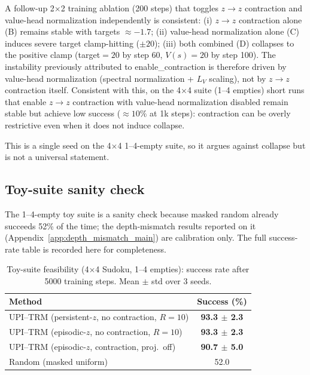 \documentclass{article}
\theoremstyle{plain}
\theoremstyle{definition}
\theoremstyle{remark}
\begin{document}
A follow-up 2$\times$2 training ablation (200 steps) that toggles $z\!\to\!z$ contraction and value-head normalization independently is consistent: (i) $z\!\to\!z$ contraction alone (B) remains stable with targets $\approx -1.7$; (ii) value-head normalization alone (C) induces severe target clamp-hitting ($\pm 20$); (iii) both combined (D) collapses to the positive clamp (target${}=20$ by step 60, $V(s)=20$ by step 100).
The instability previously attributed to enable\_contraction is therefore driven by value-head normalization (spectral normalization + $L_V$ scaling), not by $z\!\to\!z$ contraction itself.
Consistent with this, on the 4$\times$4 suite (1--4 empties) short runs that enable $z\!\to\!z$ contraction with value-head normalization disabled remain stable but achieve low success (${\approx}10\%$ at 1k steps): contraction can be overly restrictive even when it does not induce collapse.

This is a single seed on the 4$\times$4 1--4-empty suite, so it argues against collapse but is not a universal statement.




\subsection{Toy-suite sanity check}
\label{app:toy_feasibility}

The 1--4-empty toy suite is a sanity check because masked random already succeeds 52\% of the time; the depth-mismatch results reported on it (Appendix~\ref{app:depth_mismatch_main}) are calibration only. The full success-rate table is recorded here for completeness.

\begin{table}[t]
\caption{Toy-suite feasibility (4$\times$4 Sudoku, 1--4 empties): success rate after 5000 training steps. Mean $\pm$ std over 3 seeds.}
\label{tab:upi_success_only}
\centering
\small
\begin{tabular*}{\columnwidth}{@{\extracolsep{\fill}}lc@{}}
\toprule
Method & Success (\%) \\
\midrule
UPI--TRM (persistent-$z$, no contraction, $R{=}10$) & \textbf{93.3 $\pm$ 2.3} \\
UPI--TRM (episodic-$z$, no contraction, $R{=}10$) & \textbf{93.3 $\pm$ 2.3} \\
UPI--TRM (episodic-$z$, contraction, proj.\ off) & \textbf{90.7 $\pm$ 5.0} \\
Random (masked uniform) & 52.0 \\
\bottomrule
\end{tabular*}
\end{table}
\end{document}
